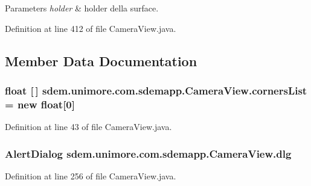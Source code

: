 \begin{DoxyParams}{Parameters}
{\em holder} & holder della surface. \\
\hline
\end{DoxyParams}


Definition at line 412 of file Camera\+View.\+java.



\subsection{Member Data Documentation}
\hypertarget{classsdem_1_1unimore_1_1com_1_1sdemapp_1_1_camera_view_ae79d568475e05039fa7eeaa71c1fa4d7}{
\subsubsection[{corners\+List}]{\setlength{\rightskip}{0pt plus 5cm}float \mbox{[}$\,$\mbox{]} sdem.\+unimore.\+com.\+sdemapp.\+Camera\+View.\+corners\+List = new float\mbox{[}0\mbox{]}\hspace{0.3cm}{\ttfamily [private]}}}\label{classsdem_1_1unimore_1_1com_1_1sdemapp_1_1_camera_view_ae79d568475e05039fa7eeaa71c1fa4d7}


Definition at line 43 of file Camera\+View.\+java.

\hypertarget{classsdem_1_1unimore_1_1com_1_1sdemapp_1_1_camera_view_a16c343ddd35e05221fe34dda8901b514}{
\subsubsection[{dlg}]{\setlength{\rightskip}{0pt plus 5cm}Alert\+Dialog sdem.\+unimore.\+com.\+sdemapp.\+Camera\+View.\+dlg\hspace{0.3cm}{\ttfamily [private]}}}\label{classsdem_1_1unimore_1_1com_1_1sdemapp_1_1_camera_view_a16c343ddd35e05221fe34dda8901b514}


Definition at line 256 of file Camera\+View.\+java.

